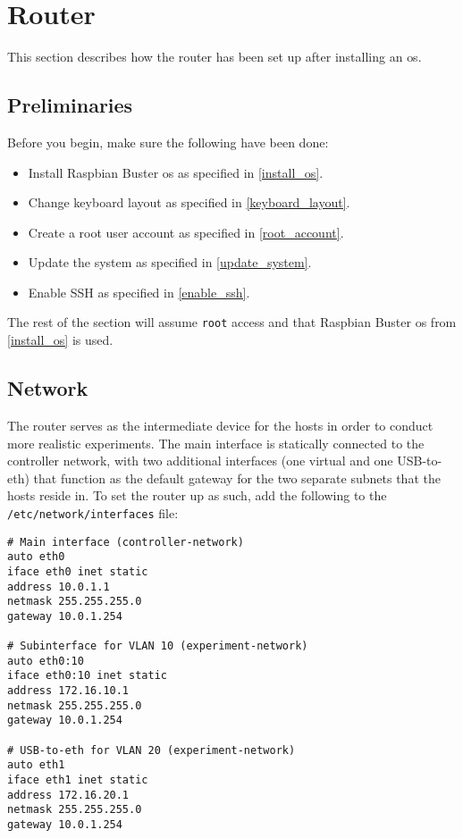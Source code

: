 \chapter{Router}

This section describes how the router has been set up after installing an \gls{os}.

\section{Preliminaries}

Before you begin, make sure the following have been done:

\begin{itemize}
    \item Install Raspbian Buster \gls{os} as specified in \ref{install_os}.
    \item Change keyboard layout as specified in \ref{keyboard_layout}.
    \item Create a root user account as specified in \ref{root_account}.
    \item Update the system as specified in \ref{update_system}.
    \item Enable SSH as specified in \ref{enable_ssh}.
\end{itemize}

The rest of the section will assume \lstinline{root} access and that Raspbian Buster \gls{os} from \ref{install_os} is used.


\section{Network}

The router serves as the intermediate device for the hosts in order to conduct more realistic experiments. The main interface is statically connected to the controller network, with two additional interfaces (one virtual and one USB-to-eth) that function as the default gateway for the two separate subnets that the hosts reside in. To set the router up as such, add the following to the \lstinline{/etc/network/interfaces} file:

\begin{verbatim}
# Main interface (controller-network)
auto eth0
iface eth0 inet static
address 10.0.1.1
netmask 255.255.255.0
gateway 10.0.1.254

# Subinterface for VLAN 10 (experiment-network)
auto eth0:10
iface eth0:10 inet static
address 172.16.10.1
netmask 255.255.255.0
gateway 10.0.1.254

# USB-to-eth for VLAN 20 (experiment-network)
auto eth1
iface eth1 inet static
address 172.16.20.1
netmask 255.255.255.0
gateway 10.0.1.254
\end{verbatim}

